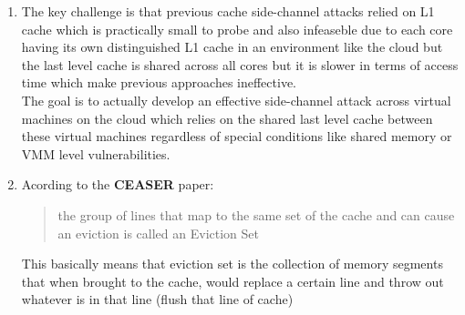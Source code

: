 
\begin{enumerate}
    \item The key challenge is that previous cache side-channel attacks relied on 
    L1 cache which is practically small to probe and also infeaseble due to each core having its own 
    distinguished L1 cache in an environment like the cloud but the last level cache is 
    shared across all cores but it is slower in terms of access time which make previous approaches ineffective.\\
    The goal is to actually develop an effective side-channel attack across virtual machines on the cloud which relies on the shared last level cache between 
    these virtual machines regardless of special conditions like shared memory or VMM level vulnerabilities.

    \item Acording to the \textbf{CEASER} paper: \begin{quote}
        the group of lines that
map to the same set of the cache and can cause an eviction is
called an Eviction Set
    \end{quote}
    This basically means that eviction set is the collection of memory segments that when brought to the cache, would 
    replace a certain line and throw out whatever is in that line (flush that line of cache)
\end{enumerate}